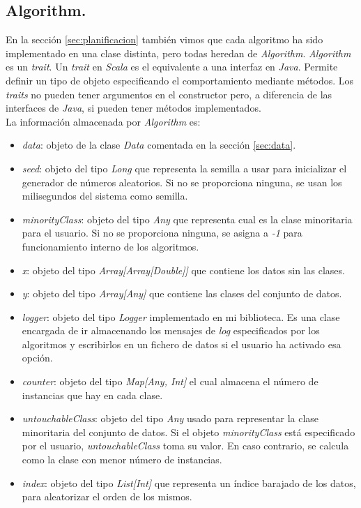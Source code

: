 \subsection{Algorithm.} \label{sec:algorithm}

En la sección \ref{sec:planificacion} también vimos que cada algoritmo ha sido implementado en una clase distinta, pero todas heredan de \textit{Algorithm}. \textit{Algorithm} es un \textit{trait}. Un \textit{trait} en \textit{Scala} \cite{trait-scala} es el equivalente a una interfaz en \textit{Java}. Permite definir un tipo de objeto especificando el comportamiento mediante métodos. Los \textit{traits} no pueden tener argumentos en el constructor pero, a diferencia de las interfaces de \textit{Java}, si pueden tener métodos implementados. \\

La información almacenada por \textit{Algorithm} es:

\begin{itemize}
    \item \textit{data}: objeto de la clase \textit{Data} comentada en la sección \ref{sec:data}.
    \item \textit{seed}: objeto del tipo \textit{Long} que representa la semilla a usar para inicializar el generador de números aleatorios. Si no se proporciona ninguna, se usan los milisegundos del sistema como semilla.
    \item \textit{minorityClass}: objeto del tipo \textit{Any} que representa cual es la clase minoritaria para el usuario. Si no se proporciona ninguna, se asigna a \textit{-1} para funcionamiento interno de los algoritmos.
    \item \textit{x}: objeto del tipo \textit{Array[Array[Double]]} que contiene los datos sin las clases.     
    \item \textit{y}: objeto del tipo \textit{Array[Any]} que contiene las clases del conjunto de datos.
    \item \textit{logger}: objeto del tipo \textit{Logger} implementado en mi biblioteca. Es una clase encargada de ir almacenando los mensajes de \textit{log} especificados por los algoritmos y escribirlos en un fichero de datos si el usuario ha activado esa opción.
    \item \textit{counter}: objeto del tipo \textit{Map[Any, Int]} el cual almacena el número de instancias que hay en cada clase.
    \item \textit{untouchableClass}: objeto del tipo \textit{Any} usado para representar la clase minoritaria del conjunto de datos. Si el objeto \textit{minorityClass} está especificado por el usuario, \textit{untouchableClass} toma su valor. En caso contrario, se calcula como la clase con menor número de instancias.
    \item \textit{index}: objeto del tipo \textit{List[Int]} que representa un índice barajado de los datos, para aleatorizar el orden de los mismos.
\end{itemize}

